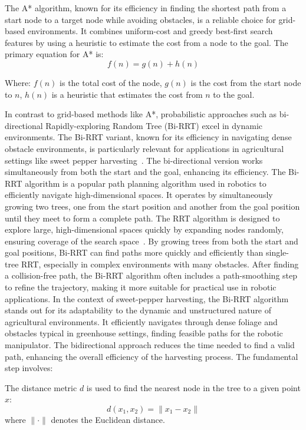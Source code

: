 \documentclass{ieeeaccess}
\begin{document}
The A* algorithm, known for its efficiency in finding the shortest path from a start node to a target node while avoiding obstacles, is a reliable choice for grid-based environments. It combines uniform-cost and greedy best-first search features by using a heuristic to estimate the cost from a node to the goal. The primary equation for A* is:
\begin{equation}
f(n) = g(n) + h(n)
\label{eq:astar}
\end{equation}

Where:
$f(n)$ is the total cost of the node, 
$g(n)$ is the cost from the start node to $n$, 
$h(n)$ is a heuristic that estimates the cost from $n$ to the goal.

In contrast to grid-based methods like A*, probabilistic approaches such as bi-directional Rapidly-exploring Random Tree (Bi-RRT) excel in dynamic environments. The Bi-RRT variant, known for its efficiency in navigating dense obstacle environments, is particularly relevant for applications in agricultural settings like sweet pepper harvesting~\cite {bac2016analysis}. The bi-directional version works simultaneously from both the start and the goal, enhancing its efficiency. 
The Bi-RRT algorithm is a popular path planning algorithm used in robotics to efficiently navigate high-dimensional spaces. It operates by simultaneously growing two trees, one from the start position and another from the goal position until they meet to form a complete path.
The RRT algorithm is designed to explore large, high-dimensional spaces quickly by expanding nodes randomly, ensuring coverage of the search space~\cite{lavalle1998rapidly}.
By growing trees from both the start and goal positions, Bi-RRT can find paths more quickly and efficiently than single-tree RRT, especially in complex environments with many obstacles.
After finding a collision-free path, the Bi-RRT algorithm often includes a path-smoothing step to refine the trajectory, making it more suitable for practical use in robotic applications.
In the context of sweet-pepper harvesting, the Bi-RRT algorithm stands out for its adaptability to the dynamic and unstructured nature of agricultural environments. It efficiently navigates through dense foliage and obstacles typical in greenhouse settings, finding feasible paths for the robotic manipulator. The bidirectional approach reduces the time needed to find a valid path, enhancing the overall efficiency of the harvesting process.
The fundamental step involves:

The distance metric \( d \) is used to find the nearest node in the tree to a given point \( x \):
\begin{equation}
d(x_1, x_2) = \| x_1 - x_2 \|
\end{equation}
where \( \| \cdot \| \) denotes the Euclidean distance.
\end{document}
